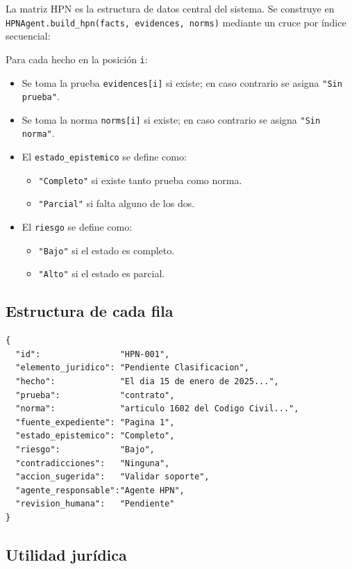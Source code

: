 \documentclass[12pt, letterpaper]{article}
\begin{document}
La matriz HPN es la estructura de datos central del sistema. Se
construye en \texttt{HPNAgent.build\_hpn(facts, evidences, norms)}
mediante un cruce por índice secuencial:

\noindent Para cada hecho en la posición \texttt{i}:

\begin{itemize}[nosep]
  \item Se toma la prueba \texttt{evidences[i]} si existe;
    en caso contrario se asigna \texttt{"Sin prueba"}.
  \item Se toma la norma \texttt{norms[i]} si existe;
    en caso contrario se asigna \texttt{"Sin norma"}.
  \item El \texttt{estado\_epistemico} se define como:
    \begin{itemize}[nosep]
      \item \texttt{"Completo"} si existe tanto prueba como norma.
      \item \texttt{"Parcial"} si falta alguno de los dos.
    \end{itemize}
  \item El \texttt{riesgo} se define como:
    \begin{itemize}[nosep]
      \item \texttt{"Bajo"} si el estado es completo.
      \item \texttt{"Alto"} si el estado es parcial.
    \end{itemize}
\end{itemize}

\subsection{Estructura de cada fila}

\begin{lstlisting}[caption={Estructura de una fila de la matriz HPN}]
{
  "id":                "HPN-001",
  "elemento_juridico": "Pendiente Clasificacion",
  "hecho":             "El dia 15 de enero de 2025...",
  "prueba":            "contrato",
  "norma":             "articulo 1602 del Codigo Civil...",
  "fuente_expediente": "Pagina 1",
  "estado_epistemico": "Completo",
  "riesgo":            "Bajo",
  "contradicciones":   "Ninguna",
  "accion_sugerida":   "Validar soporte",
  "agente_responsable":"Agente HPN",
  "revision_humana":   "Pendiente"
}
\end{lstlisting}

\subsection{Utilidad jurídica}
\end{document}
